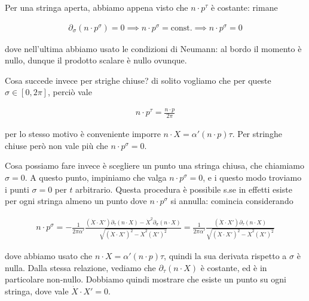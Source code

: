 \documentclass{report}
\begin{document}
Per una stringa aperta, abbiamo appena visto che \(n\cdot p^\tau\) è costante: rimane 

\begin{align}
    \partial_\sigma (n\cdot p^\sigma) = 0 \implies n\cdot p^\sigma = \text{const.} \implies n\cdot p^\sigma = 0
\end{align}

dove nell'ultima abbiamo usato le condizioni di Neumann: al bordo il momento è nullo, dunque il prodotto scalare è nullo ovunque. 

Cosa succede invece per strighe chiuse? di solito vogliamo che per queste \(\sigma \in [0, 2\pi]\), perciò vale 

\begin{align}
    n\cdot p^\tau = \frac{n\cdot p}{2\pi}
\end{align}

per lo stesso motivo è conveniente imporre \(n\cdot X = \alpha'(n\cdot p)\tau\). Per stringhe chiuse però non vale più che \(n\cdot p^\sigma = 0\). 

Cosa possiamo fare invece è scegliere un punto una stringa chiusa, che chiamiamo \(\sigma = 0\). A questo punto, impiniamo che valga \(n\cdot p^\sigma =0\), e i questo modo troviamo i punti \(\sigma=0\) per \(t\) arbitrario. Questa procedura è possibile s.se in effetti esiste per ogni stringa almeno un punto dove \(n\cdot p^\sigma\) si annulla: comincia considerando 

\begin{align}
    n\cdot p^\sigma = -\frac{1}{2\pi\alpha'}\frac{(\dot{X}\cdot X')\partial_\tau (n\cdot X)-\dot{X}^2\partial_\sigma (n \cdot X)}{\sqrt{(\dot{X}\cdot X')^2-\dot{X}^2(X')^2}} = \frac{1}{2\pi\alpha'}\frac{(\dot{X}\cdot X')\partial_\tau (n\cdot X)}{\sqrt{(\dot{X}\cdot X')^2-\dot{X}^2(X')^2}}
\end{align}

dove abbiamo usato che \(n\cdot X = \alpha'(n\cdot p)\tau\), quindi la sua derivata rispetto a \(\sigma\) è nulla. Dalla stessa relazione, vediamo che \(\partial_\tau(n\cdot X)\) è costante, ed è in particolare non-nullo. Dobbiamo quindi mostrare che esiste un punto su ogni stringa, dove vale \(\dot{X}\cdot X' =0\). 


\end{document}
